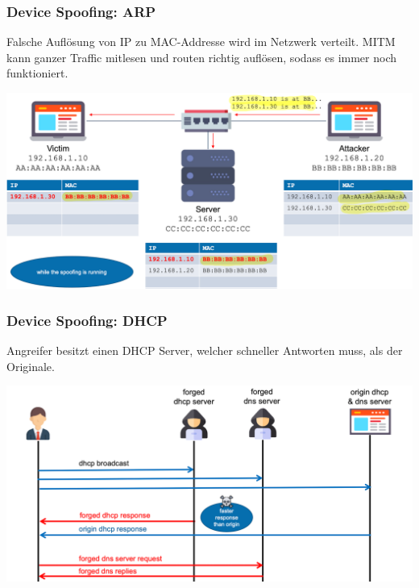 \subsubsection{Device Spoofing: ARP}
Falsche Auflösung von IP zu MAC-Addresse wird im Netzwerk verteilt. MITM kann ganzer Traffic mitlesen und routen richtig auflösen, sodass es immer noch funktioniert.
\begin{center}
    \vspace{-4pt}
    \includegraphics[width=1\linewidth]{./img/09-mitm/arp}
    \vspace{-8pt}
\end{center}
\vspace{-8pt}

\subsubsection{Device Spoofing: DHCP}
Angreifer besitzt einen DHCP Server, welcher schneller Antworten muss, als der Originale.
\begin{center}
    \vspace{-8pt}
    \includegraphics[width=1.0\linewidth]{./img/09-mitm/dhcp}
    \vspace{-8pt}
\end{center}

